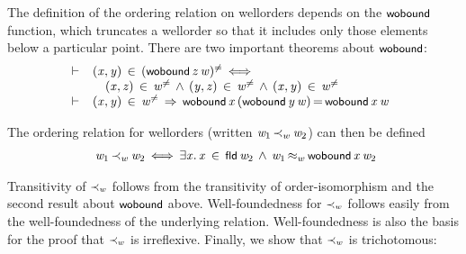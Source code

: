 \documentclass[11pt]{llncs}
\renewcommand{\HOLConst}[1]{{\textsf{\upshape\small #1}}}
\renewcommand{\HOLinline}[1]{\ensuremath{#1}}
\newcommand{\holthmenv}[1]{\begin{array}[t]{l}#1\end{array}}
\newenvironment{holmath}{\begin{displaymath}\begin{array}{l}}{\end{array}\end{displaymath}\ignorespacesafterend}
\begin{document}
The definition of the ordering relation on wellorders depends on the \HOLinline{\HOLConst{wobound}} function, which truncates a wellorder so that it includes only those elements below a particular point.
There are two important theorems about \HOLinline{\HOLConst{wobound}}:
\[
\begin{array}{l}
\vdash\;\holthmenv{(\HOLFreeVar{x},\HOLFreeVar{y})\,\HOLTokenIn{}\,(\HOLConst{wobound}\,\HOLFreeVar{z}\,\HOLFreeVar{w})\ensuremath{\sp{\ne}}\,\ensuremath{{\iff}}\\
\,\,\,\,\,\,(\HOLFreeVar{x},\HOLFreeVar{z})\,\HOLTokenIn{}\,\HOLFreeVar{w}\ensuremath{\sp{\ne}}\,\HOLTokenConj{}\,(\HOLFreeVar{y},\HOLFreeVar{z})\,\HOLTokenIn{}\,\HOLFreeVar{w}\ensuremath{\sp{\ne}}\,\HOLTokenConj{}\,(\HOLFreeVar{x},\HOLFreeVar{y})\,\HOLTokenIn{}\,\HOLFreeVar{w}\ensuremath{\sp{\ne}}} \\[2mm]
\vdash\;\holthmenv{(\HOLFreeVar{x},\HOLFreeVar{y})\,\HOLTokenIn{}\,\HOLFreeVar{w}\ensuremath{\sp{\ne}}\,\HOLTokenImp{}\,\HOLConst{wobound}\,\HOLFreeVar{x}\,(\HOLConst{wobound}\,\HOLFreeVar{y}\,\HOLFreeVar{w})\,{\ensuremath{=}}\,\HOLConst{wobound}\,\HOLFreeVar{x}\,\HOLFreeVar{w}}
\end{array}
\]
\begin{definition}
The ordering relation for wellorders (written \HOLinline{\HOLFreeVar{w\sb{\mathrm{1}}}\,{\ensuremath{\prec_w}}\,\HOLFreeVar{w\sb{\mathrm{2}}}}) can then be defined
\begin{holmath}
\,\,\HOLFreeVar{w\sb{\mathrm{1}}}\,{\ensuremath{\prec_w}}\,\HOLFreeVar{w\sb{\mathrm{2}}}\,\ensuremath{{\iff}}\,\ensuremath{{\exists}}\HOLBoundVar{x}\ensuremath{.}\,\HOLBoundVar{x}\,\HOLTokenIn{}\,\HOLConst{fld}\,\HOLFreeVar{w\sb{\mathrm{2}}}\,\HOLTokenConj{}\,\HOLFreeVar{w\sb{\mathrm{1}}}\,\ensuremath{{\approx_w}}\,\HOLConst{wobound}\,\HOLBoundVar{x}\,\HOLFreeVar{w\sb{\mathrm{2}}}
\end{holmath}
\end{definition}
Transitivity of \HOLinline{\HOLConst{{\ensuremath{\prec_w}}}} follows from the transitivity of order-isomorphism and the second result about \HOLinline{\HOLConst{wobound}} above.
Well-foundedness for \HOLinline{\HOLConst{{\ensuremath{\prec_w}}}} follows easily from the well-foundedness of the underlying relation.
Well-foundedness is also the basis for the proof that \HOLinline{\HOLConst{{\ensuremath{\prec_w}}}} is irreflexive.
Finally, we show that \HOLinline{\HOLConst{{\ensuremath{\prec_w}}}} is trichotomous:
\end{document}
